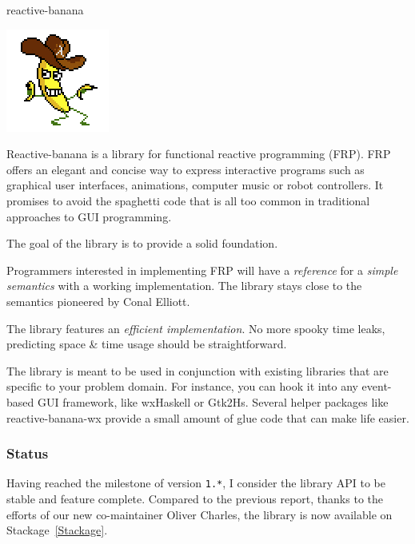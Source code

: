 \begin{hcarentry}[updated]{reactive-banana}
\makeheader

\begin{center}
\includegraphics[width=0.2\columnwidth]{html/banana.jpg}
\end{center}

Reactive-banana is a library for functional reactive programming (FRP).
%
FRP offers an elegant and concise way to express interactive programs such as
graphical user interfaces, animations, computer music or robot controllers.
It promises to avoid the spaghetti code that is all too common in traditional
approaches to GUI programming.

The goal of the library is to provide a solid foundation.

\begin{compactitem}
\item Programmers interested in implementing FRP will have a \emph{reference}
  for a \emph{simple semantics} with a working implementation. The library
  stays close to the semantics pioneered by Conal Elliott.
\item The library features an \emph{efficient implementation}. No more spooky
  time leaks, predicting space \& time usage should be straightforward.
\end{compactitem}

The library is meant to be used in conjunction with existing libraries that
are specific to your problem domain. For instance, you can hook it into any
event-based GUI framework, like wxHaskell or Gtk2Hs. Several helper packages
like reactive-banana-wx provide a small amount of glue code that can make life
easier.

\subsubsection*{Status}

Having reached the milestone of version \verb!1.*!, I consider the library API
to be stable and feature complete. Compared to the previous report, thanks to the efforts of our new co-maintainer Oliver Charles, the library is now available on Stackage~\cref{Stackage}.


\end{hcarentry}
